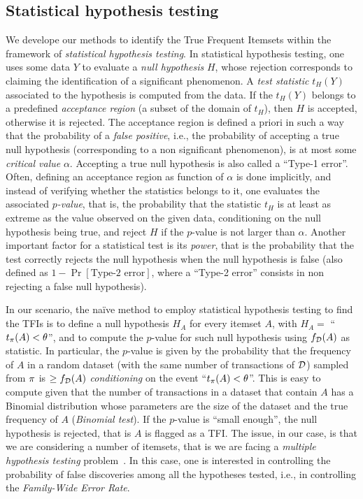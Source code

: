 \iffalse
\subsection{Statistical hypothesis testing}\label{sec:stat_tests}
We develope our methods to identify the True Frequent Itemsets within the
framework of \emph{statistical
hypothesis testing}. In statistical hypothesis testing, one uses some data
$Y$ to evaluate a \emph{null hypothesis} $H$, whose rejection corresponds to claiming
the identification of a significant phenomenon. A \emph{test statistic} $t_H(Y)$ associated
to the hypothesis is computed from the data. If the $t_H(Y)$ belongs to a predefined
\emph{acceptance region} (a subset of the domain of $t_H$), then $H$ is
accepted, otherwise it is rejected. The acceptance region is defined a priori
in such a way that the probability of a \emph{false positive}, i.e., the
probability of accepting a true null hypothesis (corresponding to a non significant 
phenomenon), is at most some \emph{critical
value} $\alpha$. Accepting a true null hypothesis is also called a ``Type-1
error''. Often, defining an acceptance region as function of $\alpha$ is done
implicitly, and instead of verifying whether the statistics belongs to it, one
evaluates the associated \emph{$p$-value}, that is, the probability that the
statistic $t_H$ is at least as extreme as the value observed on the given data,
conditioning on the null hypothesis being true, and reject $H$ if the $p$-value
is not larger than $\alpha$. Another important factor for a
statistical test is its \emph{power}, that is the probability that the test
correctly rejects the null hypothesis when the null hypothesis is false (also
defined as $1-\Pr[\text{Type-2 error}]$, where a ``Type-2 error'' consists in
non rejecting a false null hypothesis).

In our scenario, the na\"{i}ve method to employ statistical hypothesis testing
to find the TFIs is to define a null hypothesis $H_A$ for every itemset $A$,
with $H_A =$ ``$t_\pi(A) < \theta$'', and to compute the $p$-value for such null
hypothesis using $f_{\cal D} (A)$ as statistic. In particular, the $p$-value is given
by the probability that the frequency of $A$ in a random dataset (with the same
number of transactions of ${\cal D}$) sampled from $\pi$ is $\ge f_{\cal D} (A)$
\emph{conditioning} on the event ``$t_\pi(A)< \theta$''. This is easy to
compute given that the number of transactions in a dataset that contain $A$ has
a Binomial distribution whose parameters are the size of the dataset and the
true frequency of $A$ (\emph{Binomial test}). If the $p$-value is ``small enough'', the
null hypothesis is rejected, that is $A$ is flagged as a TFI. The issue, in
our case, is that we are considering a number of itemsets, that is we are facing a
\emph{multiple hypothesis testing} problem~\cite{LiuZW11}. In this case, one is
interested in controlling the probability of false discoveries among all the
hypotheses tested, i.e., in controlling the \emph{Family-Wide Error Rate}.

